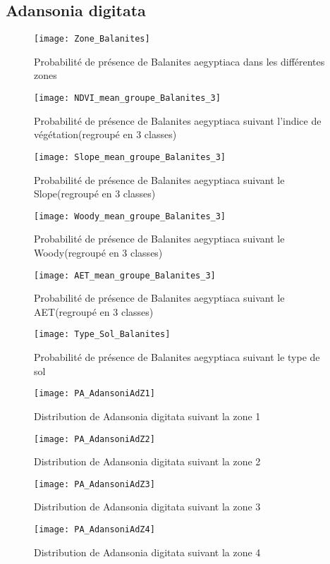 \documentclass[a4paper, oneside, 12pt]{book}
\begin{document}
\subsection{Adansonia digitata}
\begin{figure}[H]
	\centering
	\caption{Probabilité de présence de Balanites aegyptiaca dans les différentes zones}
	\texttt{[image: Zone\_Balanites]}	
\end{figure}


\begin{figure}[H]
	\centering
	\caption{Probabilité de présence de Balanites aegyptiaca suivant l'indice de végétation(regroupé en 3 classes)}
	\texttt{[image: NDVI\_mean\_groupe\_Balanites\_3]}
\end{figure}


\begin{figure}[H]
	\centering
	\caption{Probabilité de présence de Balanites aegyptiaca suivant le Slope(regroupé en 3 classes)}
	\texttt{[image: Slope\_mean\_groupe\_Balanites\_3]}
\end{figure}


\begin{figure}[H]
	\centering
	\caption{Probabilité de présence de Balanites aegyptiaca suivant le Woody(regroupé en 3 classes)}
	\texttt{[image: Woody\_mean\_groupe\_Balanites\_3]}
\end{figure}


\begin{figure}[H]
	\centering
	\caption{Probabilité de présence de Balanites aegyptiaca suivant le AET(regroupé en 3 classes)}
	\texttt{[image: AET\_mean\_groupe\_Balanites\_3]}
\end{figure}
\begin{figure}[H]
	\centering
	\caption{Probabilité de présence de Balanites aegyptiaca suivant le type de sol}
	\texttt{[image: Type\_Sol\_Balanites]}
\end{figure}
\begin{figure}[H]
	\centering
	\caption{Distribution de Adansonia digitata suivant la zone 1}
	\texttt{[image: PA\_AdansoniAdZ1]}	
\end{figure}
\begin{figure}[H]
	\centering
	\caption{Distribution de Adansonia digitata suivant la zone 2}
	\texttt{[image: PA\_AdansoniAdZ2]}	
\end{figure}
\begin{figure}[H]
	\centering
	\caption{Distribution de Adansonia digitata suivant la zone 3}
	\texttt{[image: PA\_AdansoniAdZ3]}	
\end{figure}
\begin{figure}[H]
	\centering
	\caption{Distribution de Adansonia digitata suivant la zone 4}
	\texttt{[image: PA\_AdansoniAdZ4]}	
\end{figure}
\end{document}
